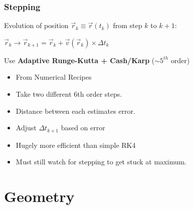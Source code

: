 \documentclass[xcolor=dvipsnames]{beamer}
\begin{document}
\begin{frame}
  \frametitle{Stepping}
  Evolution of position $\vec{r}_k \equiv \vec{r}(t_k)$ from step $k$ to $k+1$:
  \begin{center}
    $\vec{r}_k \rightarrow \vec{r}_{k+1} = \vec{r}_k + \vec{v}(\vec{r}_k) \times \Delta t_k$
  \end{center}
  Use \textbf{Adaptive Runge-Kutta + Cash/Karp} ($\sim 5^{th}$ order)
  \begin{itemize}
  \item From Numerical Recipes
  \item Take two different 6th order steps.
  \item Distance between each estimates error.
  \item Adjust $\Delta t_{k+1}$ based on error
  \item Hugely more efficient than simple RK4
  \item Must still watch for stepping to get stuck at maximum.
  \end{itemize}
\end{frame}


\section{Geometry}
\end{document}
